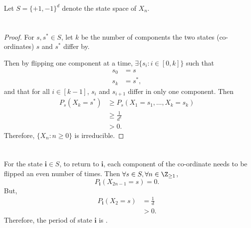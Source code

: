 \documentclass[
  coursecode={MTHE 455},
  assignmentname={Assignment \assignmentnumber},
  studentnumber=20053722,
  name={Bryan Hoang},
  draft,
]{
  ltxanswer%
}
\begin{document}
  \begin{questions}
    \setcounter{question}{\questionnumber}
    \addtocounter{question}{-1}
    \question[7]
    Let \(S=\{+1,-1\}^{d}\) denote the state space of \(X_{n}\).
    \begin{parts}
      \part{}
      \begin{solution}
        \begin{proof}
          For \(s,s^{*}\in S\), let \(k\) be the number of components the two states (co-ordinates) \(s\) and \(s^{*}\) differ by.

          Then by flipping one component at a time, \(\exists \{s_{i}:i\in[0,k]\}\) such that
          \begin{align*}
            s_{0} &= s      \\
            s_{k} &= s^{*},
          \end{align*}
          and that for all \(i\in[k-1]\), \(s_{i}\) and \(s_{i+1}\) differ in only one component.
          Then
          \begin{align*}
            P_{s}(X_{k}=s^{*}) &\ge P_{s}(X_{1}=s_{1},\dotsc,X_{k}=s_{k}) \\
                               &\ge \frac{1}{d^{k}}                       \\
                               &> 0.
          \end{align*}
          Therefore, \(\{X_{n}:n\ge0\}\) is irreducible.
        \end{proof}
      \end{solution}

      \part{}
      \begin{solution}
        For the state \(\mathbf{i}\in S\), to return to \(\mathbf{i}\), each component of the co-ordinate needs to be flipped an even number of times. Then \(\forall s\in S, \forall n\in\Z_{\ge1}\),
        \begin{equation*}
          P_{\mathbf{i}}(X_{2n-1}=s) = 0.
        \end{equation*}
        But,
        \begin{align*}
          P_{\mathbf{i}}(X_{2}=s) &= \frac{1}{d} \\
                                  &> 0.
        \end{align*}
        Therefore, the period of state \(\mathbf{i}\) is .
      \end{solution}


\end{parts}
\end{questions}
\end{document}
